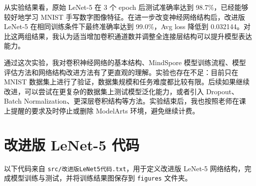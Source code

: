 \documentclass[12pt,a4paper,UTF8]{article}
\begin{document}
从实验结果看，原始 LeNet-5 在 3 个 epoch 后测试准确率达到 98.7\%，已经能够较好地学习 MNIST 手写数字图像特征。在进一步改变神经网络结构后，改进版 LeNet-5 在相同训练条件下最终准确率达到 99.0\%，Avg loss 降低到 0.032144。对比这两组结果，我认为适当增加卷积通道数并调整全连接层结构可以提升模型表达能力。

通过这次实验，我对卷积神经网络的基本结构、MindSpore 模型训练流程、模型评估方法和网络结构改进方法有了更直观的理解。实验也存在不足：目前只在 MNIST 数据集上进行了验证，数据集规模和任务难度都比较有限。后续如果继续改进，可以尝试在更复杂的数据集上测试模型泛化能力，或者引入 Dropout、Batch Normalization、更深层卷积结构等方法。实验结束后，我也按照老师在课上提醒的要求及时停止或删除 ModelArts 环境，避免继续计费。

\newpage
\appendix
\section{改进版 LeNet-5 代码}

以下代码来自 \texttt{src/改进版LeNet5代码.txt}，用于定义改进版 LeNet-5 网络结构，完成模型训练与测试，并将训练结果图保存到 \texttt{figures} 文件夹。


\end{document}
